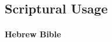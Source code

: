 

\subsection{Scriptural Usage} %
	\label{TEMPTATION-SCRIPTURES}

	
	
			
			
		\paragraph{Hebrew Bible}
			\label{TEMPTATION-HEBREW}
		
			\subparagraph{\texorpdfstring{}{}} %
				\label{NASAH} %
			
